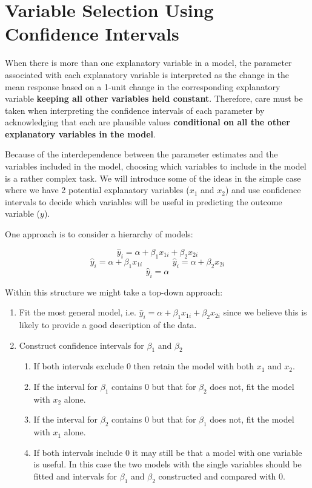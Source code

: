 \documentclass[]{article}
\providecommand{\tightlist}{%
  \setlength{\itemsep}{0pt}\setlength{\parskip}{0pt}}
\begin{document}
\newpage

\section{Variable Selection Using Confidence Intervals}\label{sec:CIs}

When there is more than one explanatory variable in a model, the
parameter associated with each explanatory variable is interpreted as
the change in the mean response based on a 1-unit change in the
corresponding explanatory variable \textbf{keeping all other variables
held constant}. Therefore, care must be taken when interpreting the
confidence intervals of each parameter by acknowledging that each are
plausible values \textbf{conditional on all the other explanatory
variables in the model}.

Because of the interdependence between the parameter estimates and the
variables included in the model, choosing which variables to include in
the model is a rather complex task. We will introduce some of the ideas
in the simple case where we have 2 potential explanatory variables
(\(x_1\) and \(x_2\)) and use confidence intervals to decide which
variables will be useful in predicting the outcome variable (\(y\)).

One approach is to consider a hierarchy of models:

\[\hat{y}_i = \alpha + \beta_1 x_{1i} + \beta_2 x_{2i}\]
\[\hat{y}_i = \alpha + \beta_1 x_{1i} ~~~~~~~~~~~~~~~~ \hat{y}_i = \alpha + \beta_2 x_{2i}\]
\[\hat{y}_i = \alpha\]

Within this structure we might take a top-down approach:

\begin{enumerate}
\def\labelenumi{\arabic{enumi}.}
\tightlist
\item
  Fit the most general model, i.e.
  \(\hat{y}_i = \alpha + \beta_1 x_{1i} + \beta_2 x_{2i}\) since we
  believe this is likely to provide a good description of the data.
\item
  Construct confidence intervals for \(\beta_1\) and \(\beta_2\)

  \begin{enumerate}
  \def\labelenumii{\alph{enumii}.}
  \tightlist
  \item
    If both intervals exclude 0 then retain the model with both \(x_1\)
    and \(x_2\).
  \item
    If the interval for \(\beta_1\) contains 0 but that for \(\beta_2\)
    does not, fit the model with \(x_2\) alone.
  \item
    If the interval for \(\beta_2\) contains 0 but that for \(\beta_1\)
    does not, fit the model with \(x_1\) alone.
  \item
    If both intervals include 0 it may still be that a model with one
    variable is useful. In this case the two models with the single
    variables should be fitted and intervals for \(\beta_1\) and
    \(\beta_2\) constructed and compared with 0.
  \end{enumerate}
\end{enumerate}
\end{document}
